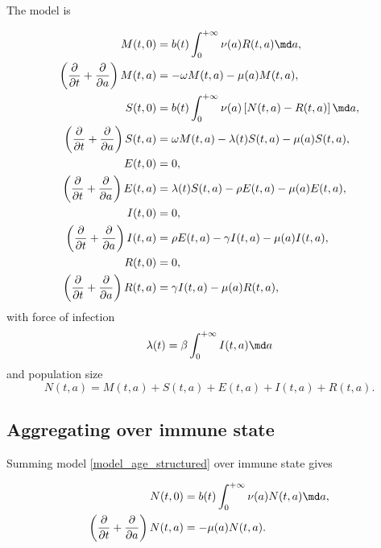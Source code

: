 \documentclass{jpmarticle}
\let\subequationsorig\subequations%
\let\endsubequationsorig\endsubequations%
\renewenvironment{subequations}{
  \subequationsorig
  \renewcommand{\theequation}{\theparentequation.\arabic{equation}}
}{
  \endsubequationsorig
}
\begin{document}
The model is
\begin{subequations}
  \label{model_age_structured}
  \begin{align}
    M(t, 0)
    &= b(t) \int_0^{+\infty} \nu(a) R(t, a) \md a,
    \\
    \left(\frac{\partial}{\partial t}
      + \frac{\partial}{\partial a}\right)
    M(t, a)
    &= - \omega M(t, a) - \mu(a) M(t, a),
    \\
    S(t, 0)
    &= b(t) \int_0^{+\infty} \nu(a) \left[N(t, a) - R(t, a)\right] \md a,
    \\
    \left(\frac{\partial}{\partial t}
      + \frac{\partial}{\partial a}\right)
    S(t, a)
    &= \omega M(t, a) - \lambda(t) S(t, a) - \mu(a) S(t, a),
    \\
    E(t, 0)
    &= 0,
    \\
    \left(\frac{\partial}{\partial t}
      + \frac{\partial}{\partial a}\right)
    E(t, a)
    &= \lambda(t) S(t, a) - \rho E(t, a) - \mu(a) E(t, a),
    \\
    I(t, 0)
    &= 0,
    \\
    \left(\frac{\partial}{\partial t}
      + \frac{\partial}{\partial a}\right)
    I(t, a)
    &= \rho E(t, a) - \gamma I(t, a) - \mu(a) I(t, a),
    \\
    R(t, 0)
    &= 0,
    \\
    \left(\frac{\partial}{\partial t}
      + \frac{\partial}{\partial a}\right)
    R(t, a)
    &= \gamma I(t, a) - \mu(a) R(t, a),
  \end{align}
  with force of infection
  \begin{equation}
    \lambda(t) = \beta \int_0^{+\infty} I(t, a) \md a
  \end{equation}
  and population size
  \begin{equation}
    N(t, a) = M(t, a) + S(t, a) + E(t, a) + I(t, a) + R(t, a).
  \end{equation}
\end{subequations}


\subsection{Aggregating over immune state}

Summing model \eqref{model_age_structured} over immune state gives
\begin{subequations}
  \label{model_age_structured_agg_state}
  \begin{align}
    N(t, 0)
    &= b(t) \int_0^{+\infty} \nu(a) N(t, a) \md a,
    \\
    \left(\frac{\partial}{\partial t}
      + \frac{\partial}{\partial a}\right)
    N(t, a)
    &= - \mu(a) N(t, a).
  \end{align}
\end{subequations}
\end{document}

